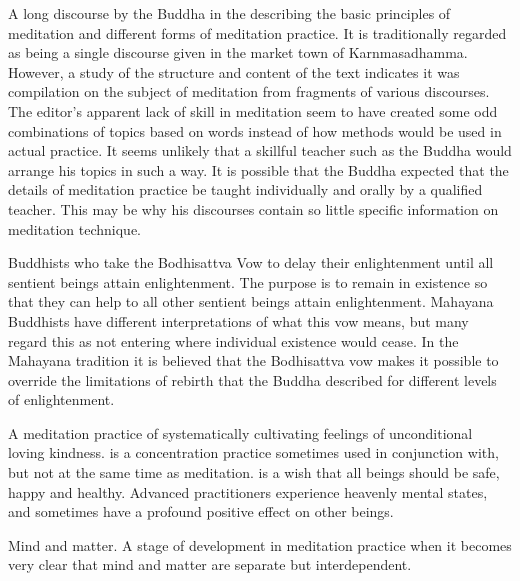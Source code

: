\documentclass[a5paper,10pt,english]{book}
\begin{document}
\begin{description}
\begin{enumerate}
\end{enumerate}

\sphinxAtStartPar
A long discourse by the Buddha in the  describing the basic principles of meditation and different
forms of meditation practice. It is traditionally regarded as being a
single discourse given in the market town of Karnmasadhamma. However, a
study of the structure and content of the text indicates it was
compilation on the subject of meditation from fragments of various
discourses. The editor’s apparent lack of skill in meditation seem to
have created some odd combinations of topics based on words instead of
how methods would be used in actual practice. It seems unlikely that a
skillful teacher such as the Buddha would arrange his topics in such a
way. It is possible that the Buddha expected that the details of
meditation practice be taught individually and orally by a qualified
teacher. This may be why his discourses contain so little specific
information on meditation technique.

\sphinxAtStartPar
Buddhists who take the Bodhisattva Vow to delay their
enlightenment until all sentient beings attain enlightenment. The
purpose is to remain in existence so that they can help to all other
sentient beings attain enlightenment. Mahayana Buddhists have different
interpretations of what this vow means, but many regard this as not
entering  where individual existence would cease. In the
Mahayana tradition it is believed that the Bodhisattva vow makes it
possible to override the limitations of rebirth that the Buddha
described for different levels of enlightenment.

\sphinxAtStartPar
A meditation practice of systematically cultivating feelings of
unconditional loving kindness.  is a concentration practice
sometimes used in conjunction with, but not at the same time as
 meditation.  is a wish that all beings should be
safe, happy and healthy. Advanced practitioners experience heavenly
mental states, and sometimes have a profound positive effect on other
beings.

\sphinxAtStartPar
Mind and matter. A stage of development in meditation
practice when it becomes very clear that mind and matter are separate
but interdependent.


\end{description}
\end{document}
